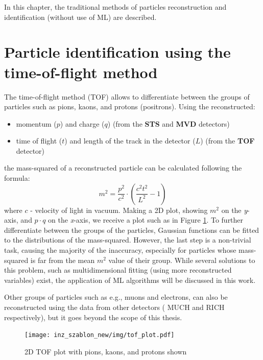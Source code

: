 \pagestyle{fancy}

In this chapter, the traditional methods of particles reconstruction and identification (without use of ML) are described.

\section{Particle identification using the time-of-flight method}\thispagestyle{fancy}



The time-of-flight method (TOF) allows to differentiate between the groups of particles such as pions, kaons, and protons (positrons). Using the reconstructed:
\begin{itemize}
    \item momentum ($p$) and charge ($q$) (from the \textbf{STS} and \textbf{MVD} detectors) 
    \item time of flight ($t$) and length of the track in the detector ($L$) (from the \textbf{TOF} detector)
\end{itemize} the mass-squared of a reconstructed particle can be calculated following the formula:
\begin{equation}
    m^2 = \frac{p^2}{c^2} \cdot \left(\frac{c^2t^2}{L^2} - 1 \right)
    \label{msquared}
\end{equation}
where  $c$ - velocity of light in vacuum. Making a 2D plot, showing $m^2$ on the \emph{y}-axis, and $p\cdot q$ on the \emph{x}-axis, we receive a plot such as in Figure \ref{tof plot}. To further differentiate between the groups of the particles, Gaussian functions can be fitted to the distributions of the mass-squared. 
However, the last step is a non-trivial task, causing the majority of the inaccuracy, especially for particles whose mass-squared is far from the mean $m^2$ value of their group. 
While several solutions to this problem, such as multidimensional fitting (using more reconstructed variables) exist, the application of ML algorithms will be discussed in this work. 

Other groups of particles such as e.g., muons and electrons, can also be reconstructed using the data from other detectors ( MUCH and RICH respectively), but it goes beyond the scope of this thesis.

\begin{figure}[H]
    \centering
    \texttt{[image: inz\_szablon\_new/img/tof\_plot.pdf]}
    \caption{2D TOF plot with pions, kaons, and protons shown}
    \label{tof plot}
\end{figure}
    

